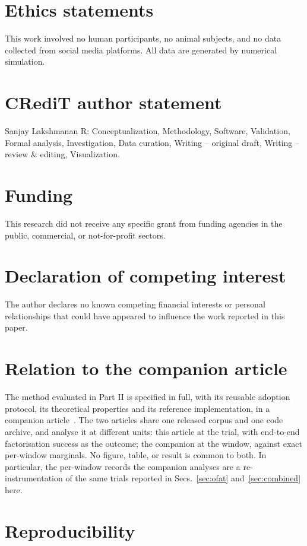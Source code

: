 \section*{Ethics statements}
This work involved no human participants, no animal subjects, and no data
collected from social media platforms. All data are generated by numerical
simulation.

\section*{CRediT author statement}
\noindent
Sanjay Lakshmanan R: Conceptualization, Methodology, Software, Validation,
Formal analysis, Investigation, Data curation, Writing -- original draft,
Writing -- review \& editing, Visualization.

\section*{Funding}
This research did not receive any specific grant from funding agencies in
the public, commercial, or not-for-profit sectors.

\section*{Declaration of competing interest}
The author declares no known competing financial interests or personal
relationships that could have appeared to influence the work reported in
this paper.

\section*{Relation to the companion article}
The method evaluated in Part II is specified in full, with its reusable
adoption protocol, its theoretical properties and its reference
implementation, in a companion article~\cite{methodpaper}. The two articles
share one released corpus and one code archive, and analyse it at different
units: this article at the trial, with end-to-end factorisation success as
the outcome; the companion at the window, against exact per-window
marginals. No figure, table, or result is common to both. In particular, the
per-window records the companion analyses are a re-instrumentation of the
same trials reported in Secs.~\ref{sec:ofat} and~\ref{sec:combined} here.

\section*{Reproducibility}

